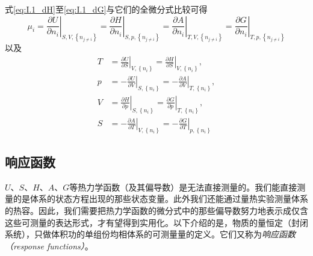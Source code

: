 \documentclass[main.tex]{subfiles}
\begin{document}
式\eqref{eq:I.1_dH}至\eqref{eq:I.1_dG}与它们的全微分式比较可得
\begin{equation}
  \mu_i=\left.\frac{\partial U}{\partial n_i}\right|_{S,V,\left\{n_{j\neq i}\right\}}
  =\left.\frac{\partial H}{\partial n_i}\right|_{S,p,\left\{n_{j\neq i}\right\}}
  =\left.\frac{\partial A}{\partial n_i}\right|_{T,V,\left\{n_{j\neq i}\right\}}
  =\left.\frac{\partial G}{\partial n_i}\right|_{T,p,\left\{n_{j\neq i}\right\}}\label{eq:I.1_first_order_partial_mu}
\end{equation}
以及
\begin{align}
  T & =\left.\frac{\partial U}{\partial S}\right|_{V,\left\{n_i\right\}}=\left.\frac{\partial H}{\partial S}\right|_{V,\left\{n_i\right\}},\label{eq:I.1_first_order_partial_T}   \\
  p & =-\left.\frac{\partial U}{\partial V}\right|_{S,\left\{n_i\right\}}=-\left.\frac{\partial A}{\partial V}\right|_{T,\left\{n_i\right\}},\label{eq:I.1_first_order_partial_p} \\
  V & =\left.\frac{\partial H}{\partial p}\right|_{S,\left\{n_i\right\}}=\left.\frac{\partial G}{\partial p}\right|_{T,\left\{n_i\right\}},\label{eq:I.1_first_order_partial_V}   \\
  S & =-\left.\frac{\partial A}{\partial T}\right|_{V,\left\{n_i\right\}}=-\left.\frac{\partial G}{\partial T}\right|_{p,\left\{n_i\right\}}\label{eq:I.1_first_order_partial_S}
\end{align}

\subsection{响应函数}
$U$、$S$、$H$、$A$、$G$等热力学函数（及其偏导数）是无法直接测量的。我们能直接测量的是体系的状态方程出现的那些状态变量。此外我们还能通过量热实验测量体系的热容。因此，我们需要把热力学函数的微分式中的那些偏导数努力地表示成仅含这些可测量的表达形式，才有望得到实用化。以下介绍的是，物质的量恒定（封闭系统），只做体积功的单组份均相体系的可测量量的定义。它们又称为\emph{响应函数（response functions）}。
\end{document}
